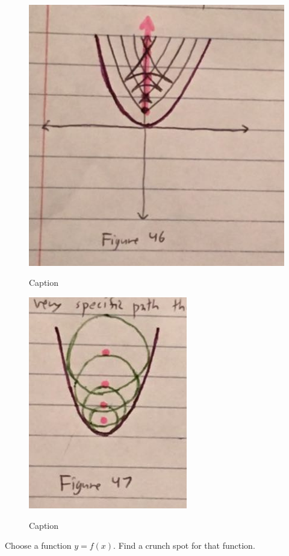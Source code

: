 \begin{figure}[H]
  \centering
  \begin{minipage}[b]{\w}
    \label{divot:7}
    \includegraphics[width=\fw]{img/12-divot/07.png}
    \caption{Caption}
  \end{minipage}
  \begin{minipage}[b]{\w}
    \label{divot:8}
    \includegraphics[width=\fw]{img/12-divot/08.png}
    \caption{Caption}
  \end{minipage}
\end{figure}

Choose a function $y = f(x)$. Find a crunch spot for that function.

